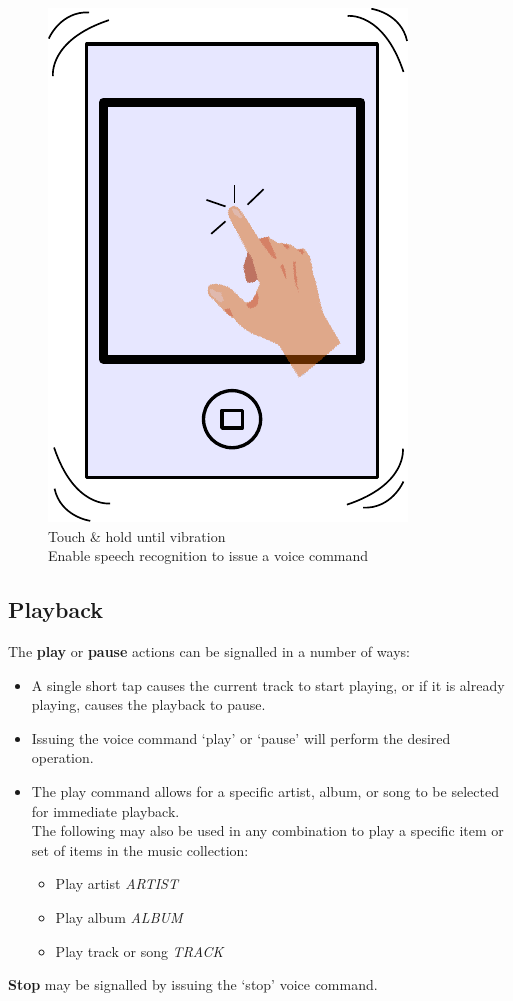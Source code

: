 \documentclass[12pt,letterpaper]{article}
\begin{document}
\begin{figure}[H]
	\centering
	\includegraphics[scale=0.6]{touch}
	\caption{Touch \& hold until vibration \\ Enable speech recognition to issue a voice command}
\end{figure}
\subsection*{Playback}
The \textbf{play} or \textbf{pause} actions can be signalled in a number of ways:
\begin{itemize}
\item A single short tap causes the current track to start playing, or if it is already playing, causes the playback to pause.
\item Issuing the voice command `play' or `pause' will perform the desired operation.
\item The play command allows for a specific artist, album, or song to be selected for immediate playback. \\ The following may also be used in any combination to play a specific item or set of items in the music collection:
	\begin{itemize}
	\item Play artist \textit{ARTIST}
	\item Play album \textit{ALBUM}
	\item Play track or song \textit{TRACK}
	\end{itemize}
\end{itemize}
\textbf{Stop} may be signalled by issuing the `stop' voice command.
\end{document}
